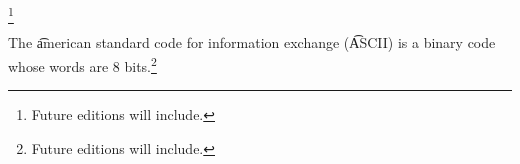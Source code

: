 
\footnote{Future editions will include.}


The \t{american standard code for information exchange} (\t{ASCII}) is a binary code whose words are 8 bits.\footnote{Future editions will include.}

\blankpage
